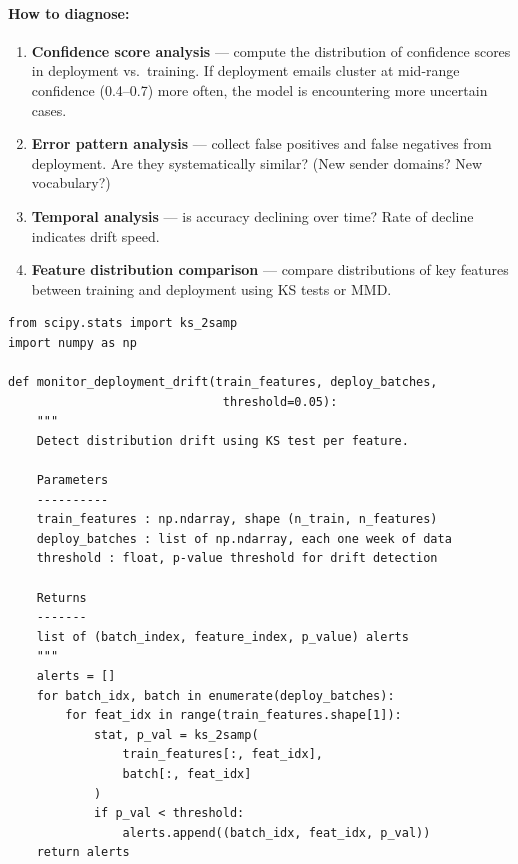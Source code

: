 \paragraph{How to diagnose:}
\begin{enumerate}
    \item \textbf{Confidence score analysis} --- compute the distribution of confidence scores in deployment vs.\ training. If deployment emails cluster at mid-range confidence (0.4--0.7) more often, the model is encountering more uncertain cases.
    \item \textbf{Error pattern analysis} --- collect false positives and false negatives from deployment. Are they systematically similar? (New sender domains? New vocabulary?)
    \item \textbf{Temporal analysis} --- is accuracy declining over time? Rate of decline indicates drift speed.
    \item \textbf{Feature distribution comparison} --- compare distributions of key features between training and deployment using KS tests or MMD.
\end{enumerate}

\begin{lstlisting}[style=python, caption={Distribution drift detection using KS test}]
from scipy.stats import ks_2samp
import numpy as np

def monitor_deployment_drift(train_features, deploy_batches,
                              threshold=0.05):
    """
    Detect distribution drift using KS test per feature.

    Parameters
    ----------
    train_features : np.ndarray, shape (n_train, n_features)
    deploy_batches : list of np.ndarray, each one week of data
    threshold : float, p-value threshold for drift detection

    Returns
    -------
    list of (batch_index, feature_index, p_value) alerts
    """
    alerts = []
    for batch_idx, batch in enumerate(deploy_batches):
        for feat_idx in range(train_features.shape[1]):
            stat, p_val = ks_2samp(
                train_features[:, feat_idx],
                batch[:, feat_idx]
            )
            if p_val < threshold:
                alerts.append((batch_idx, feat_idx, p_val))
    return alerts
\end{lstlisting}


